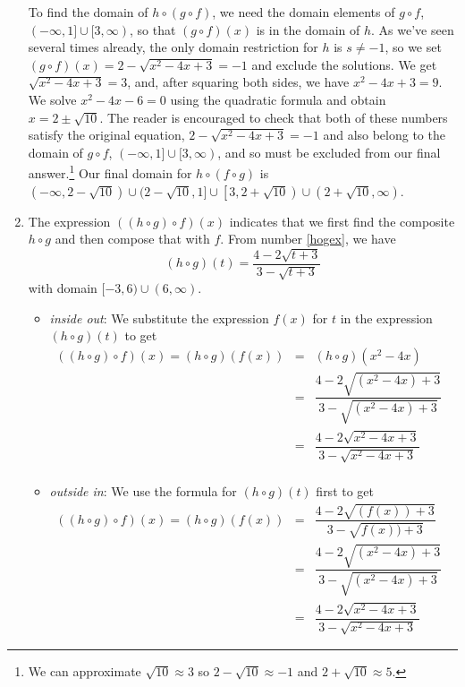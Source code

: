 \begin{ex}
\begin{enumerate}
To find the domain of $h \circ (g \circ f)$, we need the domain elements of $g \circ f$, $(-\infty, 1] \cup [3,\infty)$, so that $(g \circ f)(x)$ is in the domain of $h$.  As we've seen several times already, the only domain restriction for $h$ is $s \neq -1$, so we set  $(g \circ f)(x) = 2 - \sqrt{x^2-4x+3} = -1$ and exclude the solutions.     We get $\sqrt{x^2-4x+3} = 3$, and, after squaring both sides, we have $x^2-4x+3 = 9$.  We solve $x^2-4x-6 = 0$ using the quadratic formula and obtain $x = 2 \pm \sqrt{10}$.  The reader is encouraged to check that both of these numbers satisfy the original equation, $2 - \sqrt{x^2-4x+3} = -1$ and also belong to the domain of $g \circ f$, $(-\infty, 1] \cup [3,\infty)$, and so must be excluded from our final answer.\footnote{We can approximate $\sqrt{10} \approx 3$ so $2-\sqrt{10} \approx -1$ and $2+\sqrt{10} \approx 5$.}   Our final domain for $h \circ (f \circ g)$ is $(-\infty, 2 -\sqrt{10}) \cup (2 - \sqrt{10}, 1] \cup \left[3, 2 + \sqrt{10}\right) \cup \left(2+\sqrt{10}, \infty\right)$.

\item  The expression $((h \circ g) \circ f)(x)$ indicates that we first find the composite $h \circ g$ and then compose that with $f$.  From number \ref{hogex}, we have \[(h \circ g)(t) = \frac{4-2\sqrt{t+3}}{3-\sqrt{t+3}}\]  with domain $[-3, 6) \cup (6, \infty)$.
\begin{itemize}

\item  \textit{inside out}: We substitute the expression $f(x)$ for $t$ in the expression $(h \circ g)(t)$ to get\\
\[ \begin{array}{rclr}
((h \circ g) \circ f)(x)  =  (h \circ g)(f(x)) & = &(h \circ g)\left(x^2-4x\right) & \\[15pt]
                         & = & \dfrac{4-2\sqrt{\left(x^2-4x\right)+3}}{3-\sqrt{\left(x^2-4x\right)+3}} & \\ [20pt]
                         & = & \dfrac{4 - 2\sqrt{x^2-4x+3}}{3 - \sqrt{x^2-4x+3}} & \\ \end{array}\]

\item  \textit{outside in}:  We use the formula for $(h \circ g)(t)$ first to get\\
\[\begin{array}{rclr} ((h \circ g) \circ f)(x)  =  (h \circ g)(f(x))&=&\dfrac{4-2\sqrt{(f(x))+3}}{3-\sqrt{f(x))+3}}  & \\[20pt]
  & = & \dfrac{4 - 2\sqrt{\left(x^2-4x\right)+3}}{3 - \sqrt{\left(x^2-4x\right)+3}} & \\[20pt]
 & = & \dfrac{4 - 2\sqrt{x^2-4x+3}}{3 - \sqrt{x^2-4x+3}}
 \end{array}\]
 

\end{itemize}
\end{enumerate}
\end{ex}
